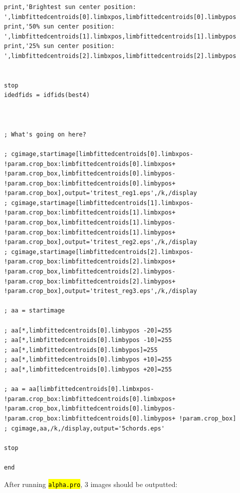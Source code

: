 \documentclass[10pt]{scrartcl}
\newcommand{\code}[1]{\hl{\texttt{#1}}}
\begin{document}
\begin{lstlisting}[texcl=false]
print,'Brightest sun center position: ',limbfittedcentroids[0].limbxpos,limbfittedcentroids[0].limbypos
print,'50% sun center position: ',limbfittedcentroids[1].limbxpos,limbfittedcentroids[1].limbypos
print,'25% sun center position: ',limbfittedcentroids[2].limbxpos,limbfittedcentroids[2].limbypos


stop
idedfids = idfids(best4)



; What's going on here?

; cgimage,startimage[limbfittedcentroids[0].limbxpos- !param.crop_box:limbfittedcentroids[0].limbxpos+ !param.crop_box,limbfittedcentroids[0].limbypos- !param.crop_box:limbfittedcentroids[0].limbypos+ !param.crop_box],output='tritest_reg1.eps',/k,/display
; cgimage,startimage[limbfittedcentroids[1].limbxpos- !param.crop_box:limbfittedcentroids[1].limbxpos+ !param.crop_box,limbfittedcentroids[1].limbypos- !param.crop_box:limbfittedcentroids[1].limbypos+ !param.crop_box],output='tritest_reg2.eps',/k,/display
; cgimage,startimage[limbfittedcentroids[2].limbxpos- !param.crop_box:limbfittedcentroids[2].limbxpos+ !param.crop_box,limbfittedcentroids[2].limbypos- !param.crop_box:limbfittedcentroids[2].limbypos+ !param.crop_box],output='tritest_reg3.eps',/k,/display

; aa = startimage

; aa[*,limbfittedcentroids[0].limbypos -20]=255
; aa[*,limbfittedcentroids[0].limbypos -10]=255
; aa[*,limbfittedcentroids[0].limbypos]=255
; aa[*,limbfittedcentroids[0].limbypos +10]=255
; aa[*,limbfittedcentroids[0].limbypos +20]=255

; aa = aa[limbfittedcentroids[0].limbxpos- !param.crop_box:limbfittedcentroids[0].limbxpos+ !param.crop_box,limbfittedcentroids[0].limbypos- !param.crop_box:limbfittedcentroids[0].limbypos+ !param.crop_box]
; cgimage,aa,/k,/display,output='5chords.eps'

stop

end
\end{lstlisting}

After running \code{alpha.pro}, 3 images should be outputted:
\end{document}
